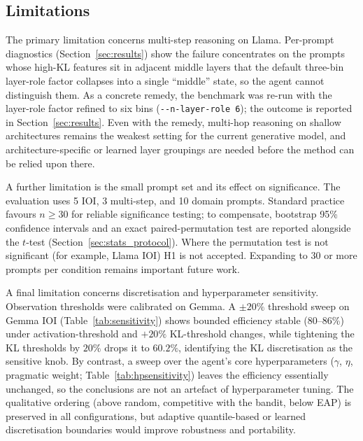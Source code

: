 \subsection{Limitations}

The primary limitation concerns multi-step reasoning on Llama.  Per-prompt diagnostics
(Section~\ref{sec:results}) show the failure concentrates on the prompts whose
high-KL features sit in adjacent middle layers that the default three-bin layer-role
factor collapses into a single ``middle'' state, so the agent cannot distinguish
them. As a concrete remedy, the benchmark was re-run with the
layer-role factor refined to six bins (\texttt{-{}-n-layer-role 6}); the outcome is
reported in Section~\ref{sec:results}. Even with the remedy,
multi-hop reasoning on shallow architectures remains the weakest setting for the
current generative model, and architecture-specific or learned layer groupings
are needed before the method can be relied upon there.

A further limitation is the small prompt set and its effect on significance. The evaluation uses 5 IOI, 3
multi-step, and 10 domain prompts. Standard practice favours $n \geq 30$ for reliable
significance testing; to compensate, bootstrap 95\% confidence intervals and
an exact paired-permutation test are reported alongside the $t$-test
(Section~\ref{sec:stats_protocol}). Where the permutation test is not significant
(for example, Llama IOI) H1 is not accepted. Expanding to 30 or more prompts per
condition remains important future work.

A final limitation concerns discretisation and hyperparameter sensitivity. Observation thresholds were
calibrated on Gemma. A $\pm 20\%$ threshold sweep on Gemma IOI
(Table~\ref{tab:sensitivity}) shows bounded efficiency stable (80--86\%) under
activation-threshold and $+20\%$ KL-threshold changes, while tightening the KL
thresholds by $20\%$ drops it to $60.2\%$, identifying the KL discretisation as the
sensitive knob. By contrast, a sweep over the agent's core hyperparameters
($\gamma$, $\eta$, pragmatic weight; Table~\ref{tab:hpsensitivity}) leaves the
efficiency essentially unchanged, so the conclusions are not an artefact of
hyperparameter tuning. The qualitative ordering (above random, competitive with the
bandit, below EAP) is preserved in all configurations, but adaptive quantile-based or
learned discretisation boundaries would improve robustness and portability.

